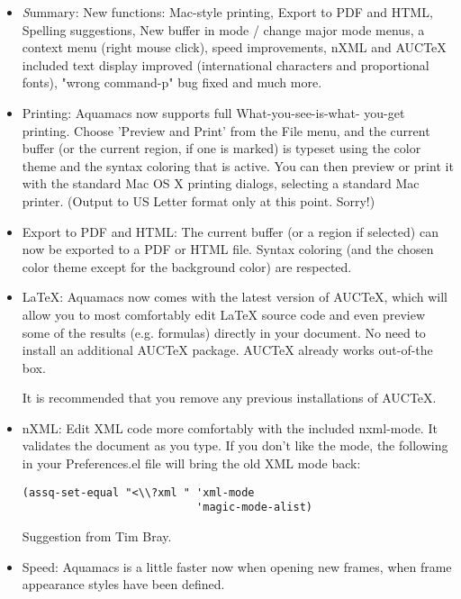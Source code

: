 \begin{itemize}


\item {\emph Summary:} New functions: Mac-style printing, Export to PDF and
	HTML, Spelling suggestions, New buffer in mode / change major mode
	menus, a context menu (right mouse click), speed improvements,
	nXML and AUCTeX included text display improved (international
	characters and proportional fonts), "wrong command-p" bug fixed
	and much more.

	
\item Printing: Aquamacs now supports full What-you-see-is-what-
	you-get printing. Choose 'Preview and Print' from the File menu,
	and the current buffer (or the current region, if one is marked)
	is typeset using the color theme and the syntax coloring that is
	active. You can then preview or print it with the standard Mac OS
	X printing dialogs, selecting a standard Mac printer. (Output to
	US Letter format only at this point. Sorry!)

\item Export to PDF and HTML: The current buffer (or a region if
	selected) can now be exported to a PDF or HTML file. Syntax
	coloring (and the chosen color theme except for the background
	color) are respected.
	
\item LaTeX: Aquamacs now comes with the latest version of
	AUCTeX, which will allow you to most comfortably edit LaTeX source
	code and even preview some of the results (e.g. formulas) directly
	in your document.  No need to install an additional AUCTeX
	package. 	AUCTeX already works out-of-the box.

	It is recommended that you remove any previous installations of
	AUCTeX. 
	
\item nXML: Edit XML code more comfortably with the included
	nxml-mode. It validates the document as you type. If you don't
	like the mode, the following in your Preferences.el file will
	bring the old XML mode back:

\begin{verbatim} 	
(assq-set-equal "<\\?xml " 'xml-mode 
                           'magic-mode-alist) 
\end{verbatim}

	Suggestion from Tim Bray.

\item Speed: Aquamacs is a little faster now when opening new frames,
	when frame appearance styles have been defined. 
	

\end{itemize}
